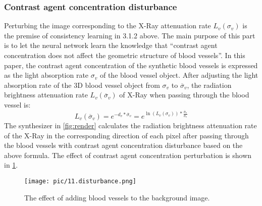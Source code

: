 \subsubsection{Contrast agent concentration disturbance}
Perturbing the image corresponding to the X-Ray attenuation rate $L_v(\sigma_v)$ is the premise of consistency learning in 3.1.2 above. The main purpose of this part is to let the neural network learn the knowledge that ``contrast agent concentration does not affect the geometric structure of blood vessels''. In this paper, the contrast agent concentration of the synthetic blood vessels is expressed as the light absorption rate $\sigma_v$ of the blood vessel object. After adjusting the light absorption rate of the 3D blood vessel object from $\sigma_v$ to $\overline{\sigma}_v$, the radiation brightness attenuation rate $L_v(\overline{\sigma}_v)$ of X-Ray when passing through the blood vessel is:
\begin{equation}
L_v(\overline{\sigma}_v) = e^{-d_v * \overline{\sigma}_v} = e^{\ln(L_v(\sigma_v)) * \frac{\overline{\sigma}_v}{\sigma_v}}
\end{equation}
The synthesizer in \cref{fig:render} calculates the radiation brightness attenuation rate of the X-Ray in the corresponding direction of each pixel after passing through the blood vessels with contrast agent concentration disturbance based on the above formula. 
The effect of contrast agent concentration perturbation is shown in \cref{fig:disturbance}.

\begin{figure}[htbp]
  \centering
  \texttt{[image: pic/11.disturbance.png]}
  \caption{The effect of adding blood vessels to the background image.}
  \label{fig:disturbance}
\end{figure}

